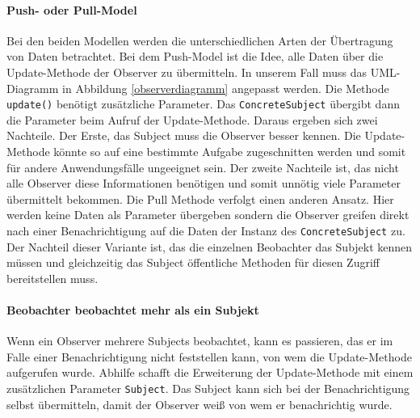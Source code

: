 \paragraph{Push- oder Pull-Model} 


Bei den beiden Modellen werden die unterschiedlichen Arten der Übertragung von Daten betrachtet. Bei dem Push-Model ist die Idee, alle Daten über die Update-Methode der Observer zu übermitteln. In unserem Fall muss das UML-Diagramm in Abbildung \ref{observerdiagramm} angepasst werden. Die Methode \texttt{update()} benötigt  zusätzliche Parameter. Das \texttt{ConcreteSubject} übergibt dann die Parameter beim Aufruf der Update-Methode.
Daraus ergeben sich zwei Nachteile. Der Erste, das Subject muss die Observer besser kennen. Die Update-Methode könnte so auf eine bestimmte Aufgabe zugeschnitten werden und somit für andere Anwendungsfälle ungeeignet sein. Der zweite Nachteile ist, das nicht alle Observer diese Informationen benötigen und somit unnötig viele Parameter übermittelt bekommen.
Die Pull Methode verfolgt einen anderen Ansatz. Hier werden keine Daten als Parameter übergeben sondern die Observer greifen direkt nach einer Benachrichtigung auf die Daten der Instanz des \texttt{ConcreteSubject} zu. Der Nachteil dieser Variante ist, das die einzelnen Beobachter das Subjekt kennen müssen und gleichzeitig das Subject öffentliche Methoden für diesen Zugriff bereitstellen muss.


\paragraph{Beobachter beobachtet mehr als ein Subjekt} Wenn ein Observer mehrere Subjects beobachtet, kann es passieren, das er im Falle einer Benachrichtigung nicht feststellen kann, von wem die Update-Methode aufgerufen wurde. Abhilfe schafft die Erweiterung der Update-Methode mit einem zusätzlichen Parameter \texttt{Subject}. Das Subject kann sich bei der Benachrichtigung selbst übermitteln, damit der Observer weiß von wem er benachrichtig wurde.

